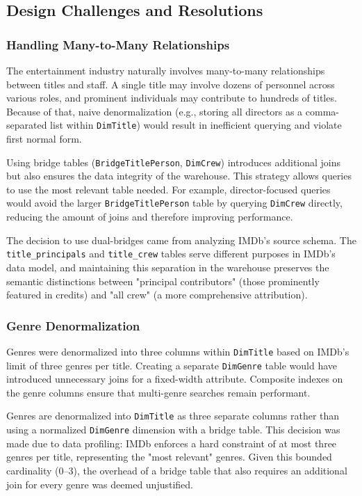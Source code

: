 \subsection{Design Challenges and Resolutions}

\subsubsection{Handling Many-to-Many Relationships}

The entertainment industry naturally involves many-to-many relationships between titles and staff. A single title may involve dozens of personnel across various roles, and prominent individuals may contribute to hundreds of titles. Because of that, naive denormalization (e.g., storing all directors as a comma-separated list within \verb|DimTitle|) would result in inefficient querying and violate first normal form.

Using bridge tables (\verb|BridgeTitlePerson|, \verb|DimCrew|) introduces additional joins but also ensures the data integrity of the warehouse. This strategy allows queries to use the most relevant table needed. For example, director-focused queries would avoid the larger \verb|BridgeTitlePerson| table by querying \verb|DimCrew| directly, reducing the amount of joins and therefore improving performance.

The decision to use dual-bridges came from analyzing IMDb's source schema. The \verb|title_principals| and \verb|title_crew| tables serve different purposes in IMDb's data model, and maintaining this separation in the warehouse preserves the semantic distinctions between "principal contributors" (those prominently featured in credits) and "all crew" (a more comprehensive attribution). 

\subsubsection{Genre Denormalization}

Genres were denormalized into three columns within \verb|DimTitle| based on IMDb’s limit of three genres per title. Creating a separate \verb|DimGenre| table would have introduced unnecessary joins for a fixed-width attribute. Composite indexes on the genre columns ensure that multi-genre searches remain performant.

Genres are denormalized into \verb|DimTitle| as three separate columns rather than using a normalized \verb|DimGenre| dimension with a bridge table. This decision was made due to data profiling: IMDb enforces a hard constraint of at most three genres per title, representing the "most relevant" genres. Given this bounded cardinality (0–3), the overhead of a bridge table that also requires an additional join for every genre was deemed unjustified.

